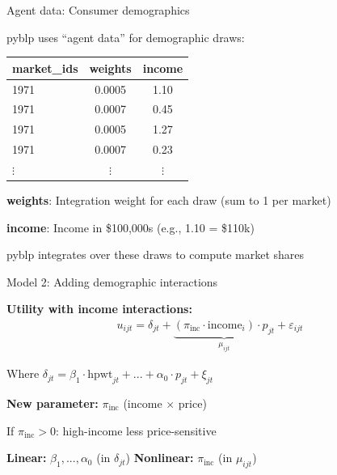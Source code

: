 \documentclass[notes,11pt, aspectratio=169]{beamer}
\newenvironment{wideitemize}{\itemize\addtolength{\itemsep}{10pt}}{\enditemize}
\begin{document}
\begin{frame}{Agent data: Consumer demographics}
	\begin{wideitemize}
		\item pyblp uses ``agent data'' for demographic draws:
	\end{wideitemize}
	\vspace{5pt}
	\begin{center}
		\small
		\begin{tabular}{lcc}
			\toprule
			\textbf{market\_ids} & \textbf{weights} & \textbf{income} \\
			\midrule
			1971 & 0.0005 & 1.10 \\
			1971 & 0.0007 & 0.45 \\
			1971 & 0.0005 & 1.27 \\
			1971 & 0.0007 & 0.23 \\
			$\vdots$ & $\vdots$ & $\vdots$ \\
			\bottomrule
		\end{tabular}
	\end{center}
	\vspace{5pt}
	\begin{wideitemize}
		\item \textbf{weights}: Integration weight for each draw (sum to 1 per market)
		\item \textbf{income}: Income in \$100,000s (e.g., 1.10 = \$110k)
		\item pyblp integrates over these draws to compute market shares
	\end{wideitemize}
\end{frame}

\begin{frame}{Model 2: Adding demographic interactions}
	\begin{wideitemize}
		\item \textbf{Utility with income interactions:}
		\begin{align*}
			u_{ijt} = \delta_{jt} + \underbrace{(\pi_{\text{inc}} \cdot \text{income}_i) \cdot p_{jt}}_{\mu_{ijt}} + \varepsilon_{ijt}
		\end{align*}
		\item Where $\delta_{jt} = \beta_1 \cdot \text{hpwt}_{jt} + ... + \alpha_0 \cdot p_{jt} + \xi_{jt}$
		\item \textbf{New parameter:} $\pi_{\text{inc}}$ (income $\times$ price)
		\begin{wideitemize}
			\item If $\pi_{\text{inc}} > 0$: high-income less price-sensitive
		\end{wideitemize}
		\item \textbf{Linear:} $\beta_1, ..., \alpha_0$ (in $\delta_{jt}$) \quad \textbf{Nonlinear:} $\pi_{\text{inc}}$ (in $\mu_{ijt}$)
	\end{wideitemize}
\end{frame}
\end{document}
